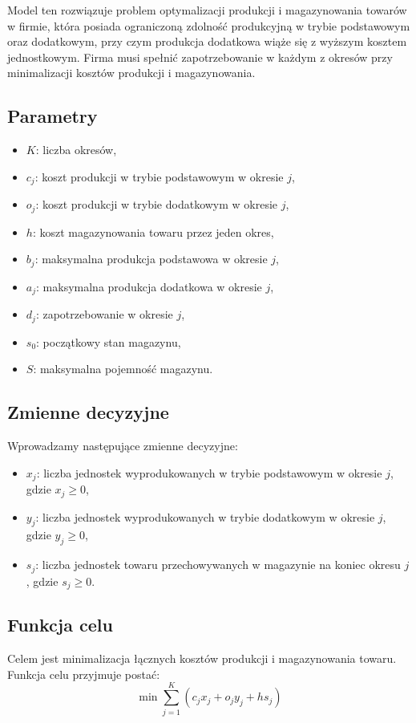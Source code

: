 \documentclass[12pt, letterpaper]{article}
\begin{document}
Model ten rozwiązuje problem optymalizacji produkcji i magazynowania towarów w
firmie, która posiada ograniczoną zdolność produkcyjną w trybie podstawowym
oraz dodatkowym, przy czym produkcja dodatkowa wiąże się z wyższym kosztem
jednostkowym. Firma musi spełnić zapotrzebowanie w każdym z okresów przy
minimalizacji kosztów produkcji i magazynowania.

\subsection{Parametry}
\begin{itemize}
  \item \( K \): liczba okresów,
  \item \( c_j \): koszt produkcji w trybie podstawowym w okresie \( j \),
  \item \( o_j \): koszt produkcji w trybie dodatkowym w okresie \( j \),
  \item \( h \): koszt magazynowania towaru przez jeden okres,
  \item \( b_j \): maksymalna produkcja podstawowa w okresie \( j \),
  \item \( a_j \): maksymalna produkcja dodatkowa w okresie \( j \),
  \item \( d_j \): zapotrzebowanie w okresie \( j \),
  \item \( s_0 \): początkowy stan magazynu,
  \item \( S \): maksymalna pojemność magazynu.
\end{itemize}

\subsection{Zmienne decyzyjne}
Wprowadzamy następujące zmienne decyzyjne:
\begin{itemize}
  \item \( x_j \): liczba jednostek wyprodukowanych w trybie podstawowym w
        okresie \( j \), gdzie \( x_j \geq 0 \),
  \item \( y_j \): liczba jednostek wyprodukowanych w trybie dodatkowym w
        okresie \( j \), gdzie \( y_j \geq 0 \),
  \item \( s_j \): liczba jednostek towaru przechowywanych w magazynie na
        koniec okresu \( j \), gdzie \( s_j \geq 0 \).
\end{itemize}

\subsection{Funkcja celu}
Celem jest minimalizacja łącznych kosztów produkcji i magazynowania towaru.
Funkcja celu przyjmuje postać:
\[
  \min \sum_{j=1}^K \left( c_j x_j + o_j y_j + h s_j \right)
\]
\end{document}
